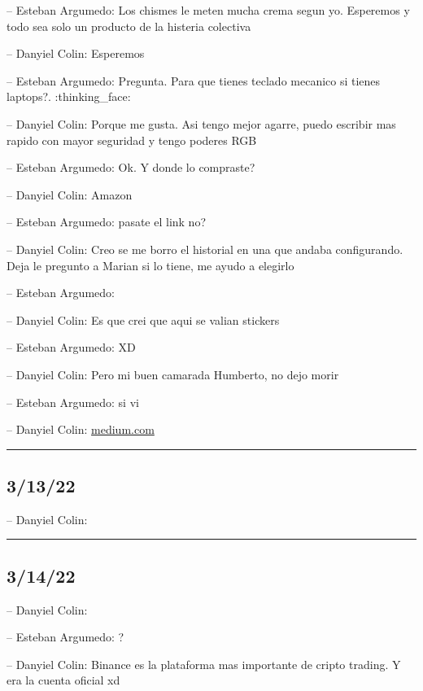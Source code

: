 -- Esteban Argumedo: Los chismes le meten mucha crema segun yo.
Esperemos y todo sea solo un producto de la histeria colectiva

-- Danyiel Colin: Esperemos

-- Esteban Argumedo: Pregunta. Para que tienes teclado mecanico si
tienes laptops?. :thinking\_face:

-- Danyiel Colin: Porque me gusta. Asi tengo mejor agarre, puedo
escribir mas rapido con mayor seguridad y tengo poderes RGB

-- Esteban Argumedo: Ok. Y donde lo compraste?

-- Danyiel Colin: Amazon

-- Esteban Argumedo: pasate el link no?

-- Danyiel Colin: Creo se me borro el historial en una que andaba
configurando. Deja le pregunto a Marian si lo tiene, me ayudo a elegirlo

-- Esteban Argumedo:

-- Danyiel Colin: Es que crei que aqui se valian stickers

-- Esteban Argumedo: XD

-- Danyiel Colin: Pero mi buen camarada Humberto, no dejo morir

-- Esteban Argumedo: si vi

-- Danyiel Colin:
\href{https://medium.com/@flix1/recesi\%C3\%B3n-en-2023-e07d4a4020b3}{medium.com}

\begin{center}\rule{0.5\linewidth}{0.5pt}\end{center}

\hypertarget{section-31}{%
\subsection{3/13/22}\label{section-31}}

-- Danyiel Colin:

\begin{center}\rule{0.5\linewidth}{0.5pt}\end{center}

\hypertarget{section-32}{%
\subsection{3/14/22}\label{section-32}}

-- Danyiel Colin:

-- Esteban Argumedo: ?

-- Danyiel Colin: Binance es la plataforma mas importante de cripto
trading. Y era la cuenta oficial xd

